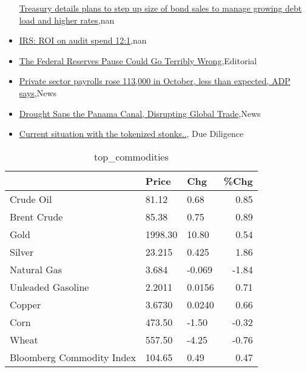 \documentclass{article}%
\begin{document}
\begin{itemize}
\href{https://reddit.com/r/Economics/comments/17legc5/treasury\_details\_plans\_to\_step\_up\_size\_of\_bond/}{Treasury details plans to step up size of bond sales to manage growing debt load and higher rates},nan%
\item%
\href{https://reddit.com/r/Economics/comments/17le8yh/irs\_roi\_on\_audit\_spend\_121/}{IRS: ROI on audit spend 12:1},nan%
\item%
\href{https://reddit.com/r/Economics/comments/17lcazx/the\_federal\_reserves\_pause\_could\_go\_terribly\_wrong/}{The Federal Reserves Pause Could Go Terribly Wrong},Editorial%
\item%
\href{https://reddit.com/r/Economics/comments/17lbcfx/private\_sector\_payrolls\_rose\_113000\_in\_october/}{Private sector payrolls rose 113,000 in October, less than expected, ADP says},News%
\item%
\href{https://reddit.com/r/Economics/comments/17l9qte/drought\_saps\_the\_panama\_canal\_disrupting\_global/}{Drought Saps the Panama Canal, Disrupting Global Trade},News%
\item%
\href{https://reddit.com/r/Superstonk/comments/17lz4eh/current\_situation\_with\_the\_tokenized\_stonks/}{Current situation with the tokenized stonks..}, Due Diligence%
\end{itemize}%


\begin{table}[htbp]%
\caption{top\_commodities}%
\centering%
\begin{adjustbox}{width=1\textwidth}%
\begin{tabular}{lllr}
\toprule
                          &   Price &    Chg &  \%Chg \\
\midrule
               Crude Oil  &   81.12 &   0.68 &  0.85 \\
             Brent Crude  &   85.38 &   0.75 &  0.89 \\
                    Gold  & 1998.30 &  10.80 &  0.54 \\
                  Silver  &  23.215 &  0.425 &  1.86 \\
             Natural Gas  &   3.684 & -0.069 & -1.84 \\
       Unleaded Gasoline  &  2.2011 & 0.0156 &  0.71 \\
                  Copper  &  3.6730 & 0.0240 &  0.66 \\
                    Corn  &  473.50 &  -1.50 & -0.32 \\
                   Wheat  &  557.50 &  -4.25 & -0.76 \\
Bloomberg Commodity Index &  104.65 &   0.49 &  0.47 \\
\bottomrule
\end{tabular}
%
\end{adjustbox}%
\end{table}
\end{document}
